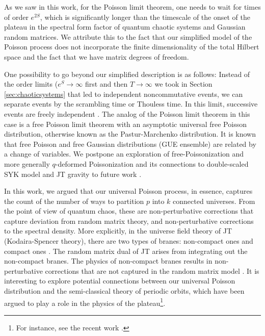 \documentclass[a4paper,11pt]{article}
\theoremstyle{definition}
\numberwithin{equation}{section}
\begin{document}
As we saw in this work, for the Poisson limit theorem, one needs to wait for times of order $e^{2S}$, which is significantly longer than the timescale of the onset of the plateau in the spectral form factor of quantum chaotic systems and Gaussian random matrices. We attribute this to the fact that our simplified model of the Poisson process does not incorporate the finite dimensionality of the total Hilbert space and the fact that we have matrix degrees of freedom. 

One possibility to go beyond our simplified description is as follows: Instead of the order limits ($e^S\to \infty$ first and then $T\to\infty$ we took in Section \ref{sec:chaoticsystems} that led to independent noncommutative events, we can separate events by the scrambling time or Thouless time. In this limit, successive events are freely independent \cite{chandrasekaran2023large}. The analog of the Poisson limit theorem in this case is a free Poisson limit theorem with an asymptotic universal free Poisson distribution, otherwise known as the Pastur-Marchenko distribution. It is known that free Poisson and free Gaussian distributions (GUE ensemble) are related by a change of variables.  We postpone an exploration of free-Poissonization and more generally $q$-deformed Poissonization and its connections to double-scaled SYK model and JT gravity to future work \cite{berkooz2019towards,lin2022bulk,lin2023symmetry}.

In this work, we argued that our universal Poisson process, in essence, captures the count of the number of ways to partition $p$ into $k$ connected universes. From the point of view of quantum chaos, these are non-perturbative corrections that capture deviation from random matrix theory, and non-perturbative corrections to the spectral density. More explicitly, in the universe field theory of JT (Kodaira-Spencer theory), there are two types of branes: non-compact ones and compact ones \cite{post2022universe}. The random matrix dual of JT arises from integrating out the non-compact branes. The physics of non-compact branes results in non-perturbative corrections that are not captured in the random matrix model \cite{saad2019jt,post2022universe,altland2023quantum}. It is interesting to explore potential connections between our universal Poisson distribution and the semi-classical theory of periodic orbits, which have been argued to play a role in the physics of the plateau\footnote{For instance, see the recent work \cite{saad2024convergent}.}.
\end{document}
